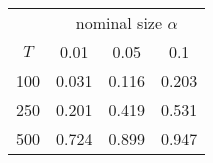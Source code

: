 % 
\begin{tabular}{cccc}
  \hline
  & \multicolumn{3}{c}{nominal size $\alpha$} \\
 $T$ & 0.01 & 0.05 & 0.1 \\
 \hline
100 & 0.031 & 0.116 & 0.203 \\ 
  250 & 0.201 & 0.419 & 0.531 \\ 
  500 & 0.724 & 0.899 & 0.947 \\ 
   \hline
\end{tabular}
